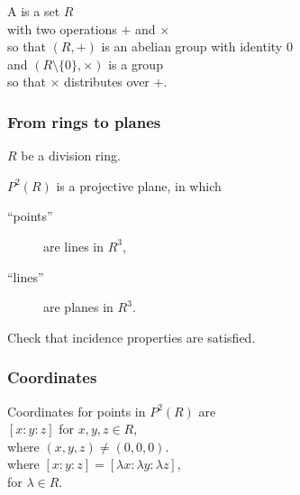 \documentclass[14pt]{chalkfjord}
\begin{document}
\begin{frame}[label=definition-division-ring]
  \begin{definition}
    A  \textcolor{gray}{ } is a set $R$ \\
    \quad with two operations $+$ and $\times$ \\
    \quad so that $(R,+)$ is an abelian group with identity 0\\
    \quad and $(R \setminus \{0\},\times)$ is a group \\
    \quad\quad so that $\times$ distributes over $+$.
  \end{definition}

  \vfill
\end{frame}

\begin{frame}
  \frametitle{From rings to planes}

  $R$ be a division ring.

  \vfill\pause

  $P^2(R)$ is a projective plane, in which
  \begin{description}
  \item[``points''] are lines in $R^3$,
  \item[``lines''] are planes in $R^3$.
  \end{description}

  \vfill\pause

  Check that incidence properties are satisfied.

\end{frame}

\begin{frame}
  \frametitle{Coordinates}

  \vfill

  Coordinates for points in $P^2(R)$ are \\
  \quad $[x:y:z]$ for $x, y, z \in R$, \\
  \quad where $(x,y,z) \neq (0,0,0)$. \\
  \vspace{3ex}
  where $[x:y:z] = [\lambda x:\lambda y:\lambda z]$, \\
  \quad for $\lambda \in R$.

  \vfill

\end{frame}
\end{document}
